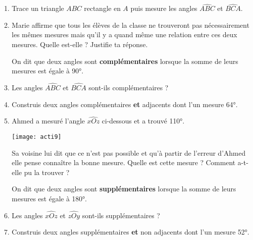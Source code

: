 \begin{activite}
\begin{enumerate} \item Trace un triangle $ABC$ rectangle en $A$ puis mesure les angles $\widehat{ABC}$ et $\widehat{BCA}$.
\item Marie affirme que tous les élèves de la classe ne trouveront pas nécessairement les mêmes mesures mais qu'il y a quand même une relation entre ces deux mesures. Quelle est-elle ? Justifie ta réponse.

\vspace{1em}

On dit que deux angles sont \textbf{complémentaires} lorsque la somme de leurs mesures est égale à 90°. 
\item Les angles $\widehat{ABC}$ et $\widehat{BCA}$ sont-ils complémentaires ?
\item  Construis deux angles complémentaires \textbf{et} adjacents dont l'un mesure 64°.
\item Ahmed a mesuré l'angle $\widehat{xOz}$ ci-dessous et a trouvé 110°.

\begin{center}
\texttt{[image: acti9]}
\end{center}

Sa voisine lui dit que ce n'est pas possible et qu'à partir de l'erreur d'Ahmed elle pense connaître la bonne mesure. Quelle est cette mesure ? Comment a-t-elle pu la trouver ?

\vspace{1em}

On dit que deux angles sont \textbf{supplémentaires} lorsque la somme de leurs mesures est égale à 180°. 
\item Les angles $\widehat{xOz}$ et $\widehat{zOy}$ sont-ils supplémentaires ?
\item Construis deux angles supplémentaires \textbf{et} non adjacents dont l'un mesure 52°.
\end{enumerate}
\end{activite}



